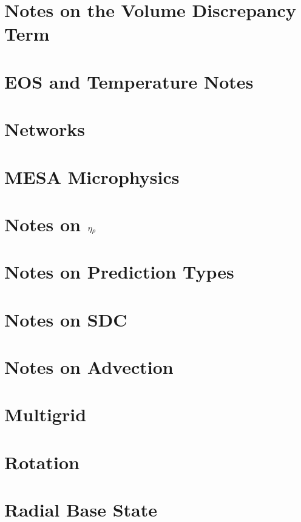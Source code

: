 \documentclass[11pt]{book}    %
\begin{document}
\chapter{Notes on the Volume Discrepancy Term}


\chapter{EOS and Temperature Notes}


\chapter{Networks}


\chapter{MESA Microphysics}


\chapter{Notes on $\eta_{\rho}$}


\chapter{Notes on Prediction Types}


\chapter{Notes on SDC}
\label{ch:sdc}


\chapter{Notes on Advection}


\chapter{Multigrid}


\chapter{Rotation}


\chapter{Radial Base State}

\end{document}
